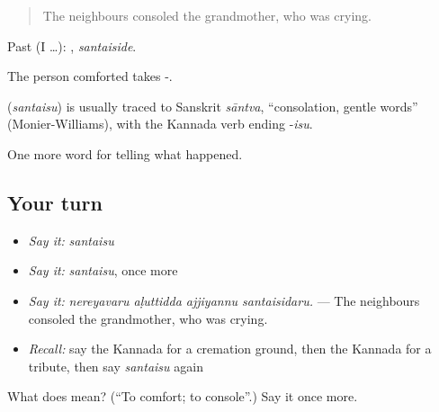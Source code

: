 \begin{quote}
The neighbours consoled the grandmother, who was crying.
\end{quote}

Past (I …): , \emph{santaiside}.

The person comforted takes -.

\begin{cousinweb}
\textbf{} (\emph{santaisu}) is usually traced to Sanskrit \emph{sāntva}, \textquotedblleft{}consolation, gentle words\textquotedblright{} (Monier-Williams), with the Kannada verb ending -\emph{isu}.
\end{cousinweb}

\begin{grammarlens}[title={What you've built}]
One more word for telling what happened.
\end{grammarlens}

\subsection*{Your turn}
\begin{itemize}
\raggedright
  \item \emph{Say it:} \emph{santaisu}
  \item \emph{Say it:} \emph{santaisu}, once more
  \item \emph{Say it:} \emph{nereyavaru aḷuttidda ajjiyannu santaisidaru.} — The neighbours consoled the grandmother, who was crying.
  \item \emph{Recall:} say the Kannada for a cremation ground, then the Kannada for a tribute, then say \emph{santaisu} again
\end{itemize}

\begin{tcolorbox}[breakable,colback=teal!4,colframe=teal!35!black,title={Before you move on}]
What does  mean? (\textquotedblleft{}To comfort; to console\textquotedblright{}.) Say it once more.
\end{tcolorbox}
